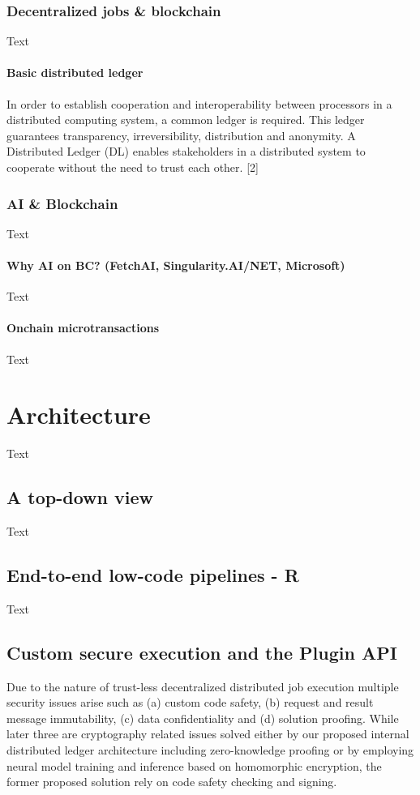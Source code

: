 \documentclass{article}
\begin{document}
\subsubsection{Decentralized jobs \& blockchain}
Text
\paragraph{Basic distributed ledger}
In order to establish cooperation and interoperability between processors in a distributed computing system, a common ledger is required. This ledger guarantees transparency, irreversibility, distribution and anonymity. A Distributed Ledger (DL) enables stakeholders in a distributed system to cooperate without the need to trust each other. [2]
\subsubsection{AI \& Blockchain}
Text
\paragraph{Why AI on BC? (FetchAI, Singularity.AI/NET, Microsoft)}
Text
\paragraph{Onchain microtransactions}
Text
\section{Architecture}
Text
\subsection{A top-down view}
Text
\subsection{End-to-end low-code pipelines - R}
Text
\subsection{Custom secure execution and the Plugin API}

Due to the nature of trust-less decentralized distributed job execution multiple security issues arise such as (a) custom code safety, (b) request and result message immutability, (c) data confidentiality and (d) solution proofing. While later three are cryptography related issues solved either by our proposed internal distributed ledger architecture including zero-knowledge proofing or by employing neural model training and inference based on homomorphic encryption, the former proposed solution rely on code safety checking and signing.
\end{document}
